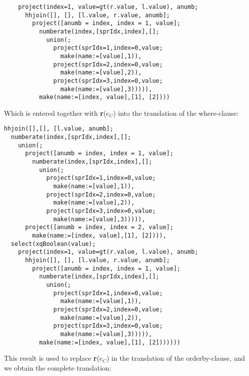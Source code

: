 \begin{Verbatim}
    project(index=1, value=gt(r.value, l.value), anumb;
      hhjoin([], [], [l.value, r.value, anumb];
        project([anumb = index, index = 1, value];
          numberate(index,[sprIdx,index],[];
            union(;
              project(sprIdx=1,index=0,value;
                make(name:=[value],1)),
              project(sprIdx=2,index=0,value;
                make(name:=[value],2)),
              project(sprIdx=3,index=0,value;
                make(name:=[value],3))))),
          make(name:=[index, value],[1], [2])))
\end{Verbatim}

Which is entered together with \textbf{r}($e_C$) into the translation of the
where-clause:

\begin{Verbatim}
hhjoin([],[], [l.value, anumb];
  numberate(index,[sprIdx,index],[];
    union(;
      project([anumb = index, index = 1, value];
        numberate(index,[sprIdx,index],[];
          union(;
            project(sprIdx=1,index=0,value;
              make(name:=[value],1)),
            project(sprIdx=2,index=0,value;
              make(name:=[value],2)),
            project(sprIdx=3,index=0,value;
              make(name:=[value],3))))),
      project([anumb = index, index = 2, value];
        make(name:=[index, value],[1], [2]))),
  select(xqBoolean(value);
    project(index=1, value=gt(r.value, l.value), anumb;
      hhjoin([], [], [l.value, r.value, anumb];
        project([anumb = index, index = 1, value];
          numberate(index,[sprIdx,index],[];
            union(;
              project(sprIdx=1,index=0,value;
                make(name:=[value],1)),
              project(sprIdx=2,index=0,value;
                make(name:=[value],2)),
              project(sprIdx=3,index=0,value;
                make(name:=[value],3))))),
          make(name:=[index, value],[1], [2]))))))
\end{Verbatim}

This result is used to replace \textbf{r}($e_C$) in the translation of the
orderby-clause, and we obtain the complete translation:

